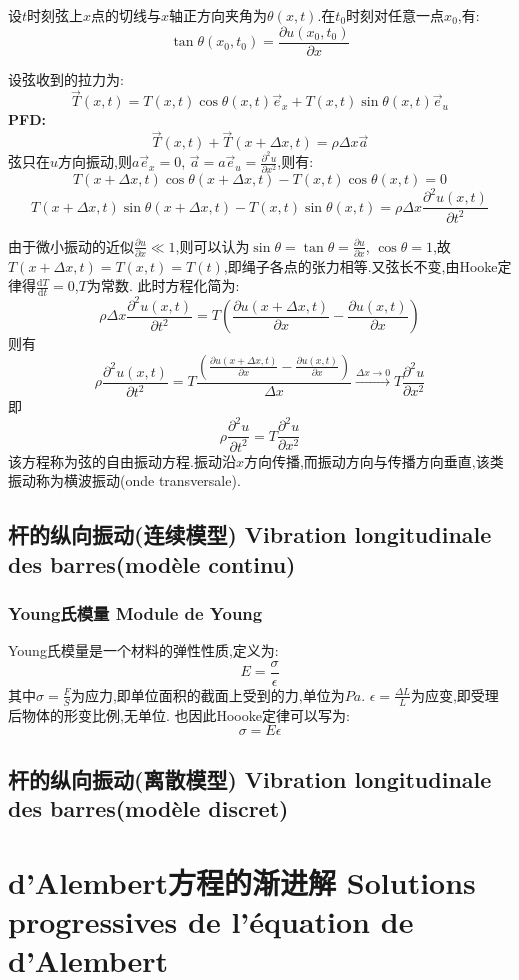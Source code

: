 \documentclass[12pt, a4paper, oneside]{ctexbook}
\newcommand{\di }{\text{d}}%
\newcommand{\pian }{\partial}%
\newcommand{\e }{\vec{e}}%
\newcommand{\x }{$x$}\newcommand{\xo }{$x_0$}
\begin{document}
  设$t$时刻弦上\x 点的切线与\x 轴正方向夹角为$\theta(x,t)$.在$t_0$时刻对任意一点\xo,有:
  $$
    \tan\theta(x_0,t_0)=\frac{\pian u(x_0,t_0)}{\pian x}
  $$
  
  设弦收到的拉力为:
  $$
  \vec{T}(x,t)=T(x,t)\cos\theta(x,t)\e_x+T(x,t)\sin\theta(x,t)\e_u
  $$
  \textbf{PFD:}
  $$
    \vec{T}(x,t)+\vec{T}(x+\Delta x,t)=\rho \Delta x \vec{a}
  $$
  弦只在$u$方向振动,则$a\e_x=0$, $\vec{a}=a\e_u=\frac{\pian^2 u}{\pian x^2}$,则有:
  $$
    T(x+\Delta x,t)\cos\theta(x+\Delta x,t)-T(x,t)\cos\theta(x,t)=0
  $$
  $$
    T(x+\Delta x,t)\sin\theta(x+\Delta x,t)-T(x,t)\sin\theta(x,t)=\rho\Delta x\frac{\pian^2 u(x,t)}{\pian t^2}
  $$

  由于微小振动的近似$\frac{\pian u}{\pian x}\ll 1$,则可以认为$\sin\theta =\tan\theta=\frac{\pian u}{\pian x}$,
  $\cos\theta=1$,故$T(x+\Delta x,t)=T(x,t)=T(t)$,即绳子各点的张力相等.又弦长不变,由Hooke定律得$\frac{\di T}{\di t}=0$,$T$为常数.
  此时方程化简为:
  $$
    \rho\Delta x\frac{\pian^2 u(x,t)}{\pian t^2}=T(\frac{\pian u(x+\Delta x,t)}{\pian x}-\frac{\pian u(x,t)}{\pian x})
  $$
  则有
  $$
  \rho\frac{\pian^2 u(x,t)}{\pian t^2}=T\frac{(\frac{\pian u(x+\Delta x,t)}{\pian x}-\frac{\pian u(x,t)}{\pian x})}{\Delta x}\xrightarrow{\Delta x\rightarrow 0}T\frac{\pian^2 u}{\pian x^2}
  $$
  即
  $$ 
    \rho\frac{\pian^2 u}{\pian t^2}=T\frac{\pian^2 u}{\pian x^2}
  $$
  该方程称为弦的自由振动方程.振动沿\x 方向传播,而振动方向与传播方向垂直,该类振动称为横波振动(onde transversale).
  \subsection{杆的纵向振动(连续模型) Vibration longitudinale des barres(modèle continu)}
  \subsubsection{Young氏模量 Module de Young} 
  Young氏模量是一个材料的弹性性质,定义为:
  $$
    E=\frac{\sigma}{\epsilon}
  $$
  其中$\sigma=\frac{F}{S}$为应力,即单位面积的截面上受到的力,单位为$Pa$. 
  $\epsilon=\frac{\Delta L}{L}$为应变,即受理后物体的形变比例,无单位.
  也因此Hoooke定律可以写为:
  $$
    \sigma=E\epsilon
  $$
  \subsection{杆的纵向振动(离散模型) Vibration longitudinale des barres(modèle discret)}
  \section{d'Alembert方程的渐进解 Solutions progressives de l'équation de d'Alembert}
\end{document}
